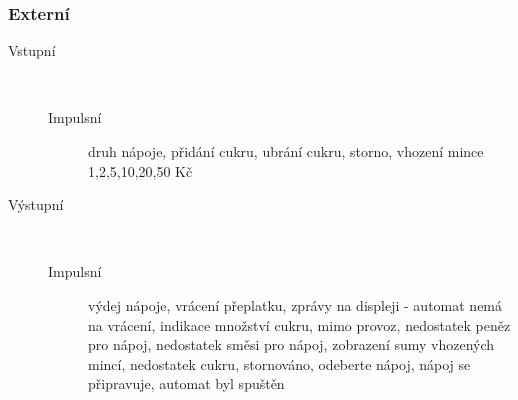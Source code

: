 \documentclass[12pt,a4paper]{article}
\begin{document}
\subsubsection{Externí}
\begin{description}

\item [Vstupní] ~
\begin{description}

\item [Impulsní] druh nápoje, přidání cukru, ubrání cukru, storno, vhození mince 1,2,5,10,20,50 Kč

\end{description}

\item [Výstupní] ~
\begin{description}

\item [Impulsní] výdej nápoje, vrácení přeplatku, zprávy na displeji - automat nemá na vrácení, indikace množství cukru, mimo provoz, nedostatek peněz pro nápoj, nedostatek směsi pro nápoj, zobrazení sumy vhozených mincí, nedostatek cukru, stornováno, odeberte nápoj, nápoj se připravuje, automat byl spuštěn

\end{description}

\end{description}
\end{document}
